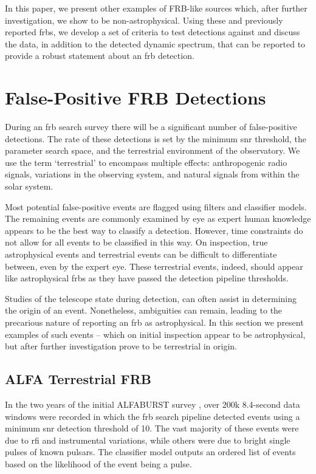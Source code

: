 \documentclass[a4paper,fleqn,usenatbib]{mnras}
\begin{document}
In this paper, we present other examples of FRB-like sources which, after
further investigation, we show to be non-astrophysical. Using these and
previously reported \glspl{frb}, we develop a set of criteria to test detections
against and discuss the data, in addition to the detected dynamic spectrum, that
can be reported to provide a robust statement about an \gls{frb} detection.

\section{False-Positive FRB Detections}
\label{sec:false-pos}

During an \gls{frb} search survey there will be a significant number of
false-positive detections. The rate of these detections is set by the minimum
\gls{snr} threshold, the parameter search space, and the terrestrial environment
of the observatory. We use the term `terrestrial' to encompass multiple effects:
anthropogenic radio signals, variations in the observing system, and natural
signals from within the solar system.

Most potential false-positive events are flagged using filters and classifier
models.  The remaining events are commonly examined by eye as expert human
knowledge appears to be the best way to classify a detection. However, time
constraints do not allow for all events to be classified in this way. On
inspection, true astrophysical events and terrestrial events can be difficult to
differentiate between, even by the expert eye.  These terrestrial events,
indeed, should appear like astrophysical \glspl{frb} as they have passed the
detection pipeline thresholds. 

Studies of the telescope state during detection, can often assist in determining
the origin of an event. Nonetheless, ambiguities can remain, leading to the
precarious nature of reporting an \gls{frb} as astrophysical.  In this section
we present examples of such events -- which on initial inspection appear to be
astrophysical, but after further investigation prove to be terrestrial in
origin.

\subsection{ALFA Terrestrial FRB}
\label{sec:D20161204}

In the two years of the initial ALFABURST survey \citep{2017ApJS..228...21C,
2018MNRAS.474.3847F}, over 200k 8.4-second data windows were recorded in which
the \gls{frb} search pipeline detected events using a minimum \gls{snr}
detection threshold of 10. The vast majority of these events were due to
\gls{rfi} and instrumental variations, while others were due to bright single
pulses of known pulsars.  The classifier model outputs an ordered list of events
based on the likelihood of the event being a pulse.
\end{document}

